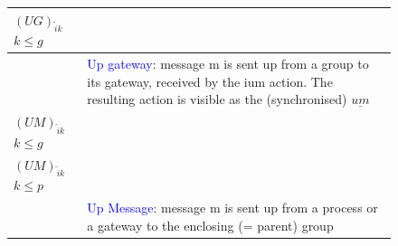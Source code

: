 \documentclass{lncs/llncs}
\newcommand{\ERIC}[1]{\textcolor{blue}{#1}}
\begin{document}
\begin{example}
  \begin{figure}[h!]
  \label{fig:HBvectors}
  \begin{tabular}{|p{1.4cm}|p{11cm}|}
  \hline
  \hline
$(UG)_{\widetilde{i}k}$\newline
 $k\leq g$&\raisebox{-2pt}{
 $\begin{array}[t]{@{}c@{}c@{}c@{}c@{}c@{}c@{}c@{}c@{}}
 &gw\widetilde{i}1,..&,gw\widetilde{i}k,&..,gw\widetilde{i}g,G\widetilde{i}1,..&,G\widetilde{i}k,&..,G\widetilde{i}g,P\widetilde{i}1,..,P\widetilde{i}p\\
<\!& -\,-\,-\    &  ,ium(\widetilde{t}),& -\ -\ -\  &,um(\widetilde{t}),&, -\ -\ -\
&\!>\longrightarrow \underline{um_{\widetilde{i}.k}(\widetilde{t})}
\end{array}$}  \raisebox{-19pt}{~}  \\
\hline
     &{\ERIC{Up gateway}: message m is sent
  up from a group to its gateway, received by the ium action. The
  resulting action is visible as the (synchronised) $\underline{um}$ }\\
\hline
 $(UM)_{\widetilde{i}k}$\newline$k\leq g$
 &\raisebox{-2pt}{$\begin{array}[t]{@{}c@{}c@{}c@{}c@{}c@{}c@{}c@{}c@{}}
 &gw\widetilde{i}1,..&,gw\widetilde{i}k,&..,gw\widetilde{i}g,G\widetilde{i}1,..,G\widetilde{i}g,P\widetilde{i}1,..,P\widetilde{i}p\\
 <\!& -\,-\,-\    &  ,um(\widetilde{t}),& -\ -\ -\   -\ -\ -\
 &\!>\longrightarrow \underline{um(\widetilde{t})}
 \end{array}$}\raisebox{-18pt}{~}\\
\hline
$(UM)_{\widetilde{i}k}$\newline$k\leq p$
&\raisebox{-2pt}{$\begin{array}[t]{@{}c@{}c@{}c@{}c@{}c@{}c@{}c@{}c@{}}
&gw\widetilde{i}1,..,gw\widetilde{i}g,G\widetilde{i}1,..,,G\widetilde{i}g,P\widetilde{i}1,..&,P\widetilde{i}k,&..,P\widetilde{i}p\\
<\!& -\ -\ -\      -\ -\ -\ &,um(\widetilde{t}),&   -\, -\, -
&\!>\longrightarrow \underline{um(\widetilde{t})}
\end{array}$}\raisebox{-18pt}{~}
\\
\hline
     &{\ERIC{Up Message}: message m is sent up from a process
  or a gateway to the enclosing (= parent) group}\\
\hline


\end{tabular}
\end{figure}
\end{example}
\end{document}
